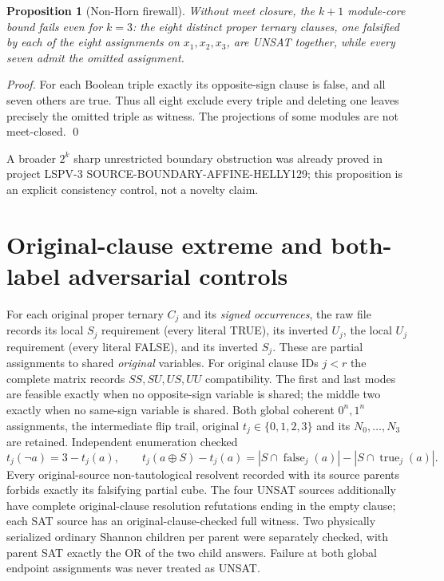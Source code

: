 \documentclass[11pt]{article}
\newtheorem{proposition}[theorem]{Proposition}
\begin{document}
\begin{proposition}[Non-Horn firewall]\label{prop:nonhorn}
Without meet closure, the $k+1$ module-core bound fails even for
$k=3$: the eight distinct proper ternary clauses, one falsified
by each of the eight assignments on $x_1,x_2,x_3$, are UNSAT together,
while every seven admit the omitted assignment.
\end{proposition}
\begin{proof}
For each Boolean triple exactly its opposite-sign clause is false,
and all seven others are true. Thus all eight exclude every triple
and deleting one leaves precisely the omitted triple as witness.
The projections of some modules are not meet-closed. \qed
\end{proof}
A broader $2^k$ sharp unrestricted boundary obstruction was already
proved in project LSPV-3 SOURCE-BOUNDARY-AFFINE-HELLY129; this proposition
is an explicit consistency control, not a novelty claim.

\section{Original-clause extreme and both-label adversarial controls}
For each original proper ternary $C_j$ and its \emph{signed occurrences},
the raw file records its local $S_j$ requirement (every literal TRUE),
its inverted $U_j$, the local $U_j$ requirement (every literal FALSE),
and its inverted $S_j$. These are partial assignments to shared
\emph{original} variables. For original clause IDs $j<r$ the complete
matrix records $SS,SU,US,UU$ compatibility. The first and last modes
are feasible exactly when no opposite-sign variable is shared;
the middle two exactly when no same-sign variable is shared.
Both global coherent $0^n,1^n$ assignments, the intermediate flip trail,
original $t_j\in\{0,1,2,3\}$ and its $N_0,\dots,N_3$ are retained.
Independent enumeration checked
\[
 t_j(\neg a)=3-t_j(a),\qquad
 t_j(a\oplus S)-t_j(a)=
 |S\cap\operatorname{false}_j(a)|-
 |S\cap\operatorname{true}_j(a)|.
\]
Every original-source non-tautological resolvent recorded with its
source parents forbids exactly its falsifying partial cube.
The four UNSAT sources additionally have complete original-clause
resolution refutations ending in the empty clause; each SAT source
has an original-clause-checked full witness. Two physically serialized
ordinary Shannon children per parent were separately checked, with
parent SAT exactly the OR of the two child answers. Failure at both
global endpoint assignments was never treated as UNSAT.
\end{document}
